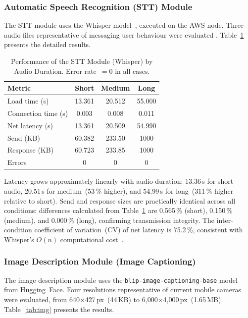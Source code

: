 \documentclass[journal]{IEEEtran}
\begin{document}
	\subsubsection{Automatic Speech Recognition (STT) Module}
	The STT module uses the Whisper model~\cite{radford2023},
	executed on the AWS node.
	Three audio files representative of messaging user behaviour
	were evaluated \cite{botelho2021}.
	Table~\ref{tab:stt} presents the detailed results.
	
	\begin{table}[!t]
		\caption{Performance of the STT Module (Whisper) by Audio Duration.
			Error rate~$=0$ in all cases.}
		\label{tab:stt}
		\centering
		\scriptsize
		\renewcommand{\arraystretch}{1.25}
		\begin{tabular}{lccc}
			\toprule
			\textbf{Metric} & \textbf{Short} & \textbf{Medium} & \textbf{Long} \\
			\midrule
			Load time (s)       & 13.361  & 20.512  & 55.000 \\
			Connection time (s) & 0.003   & 0.008   & 0.011  \\
			Net latency (s)     & 13.361  & 20.509  & 54.990 \\
			Send (KB)           & 60.382  & 233.50  & 1000   \\
			Response (KB)       & 60.723  & 233.85  & 1000   \\
			Errors              & 0       & 0       & 0      \\
			\bottomrule
		\end{tabular}
	\end{table}
	
	Latency grows approximately linearly with audio duration:
	13.36\,s for short audio, 20.51\,s for medium~(53\,\% higher),
	and 54.99\,s for long~(311\,\% higher relative to short).
	Send and response sizes are practically identical across all
	conditions: differences calculated from Table~\ref{tab:stt} are
	0.565\,\% (short), 0.150\,\% (medium), and 0.000\,\% (long),
	confirming transmission integrity.
	The inter-condition coefficient of variation~(CV) of net latency
	is 75.2\,\%, consistent with Whisper's $O(n)$ computational
	cost~\cite{radford2023}.
	
	\subsubsection{Image Description Module (Image Captioning)}
	The image description module uses the
	\texttt{blip-image-captioning-base} model from Hugging~Face.
	Four resolutions representative of current mobile cameras were
	evaluated, from 640$\times$427\,px~(44\,KB) to
	6{,}000$\times$4{,}000\,px~(1.65\,MB).
	Table~\ref{tab:img} presents the results.
	
\end{document}
